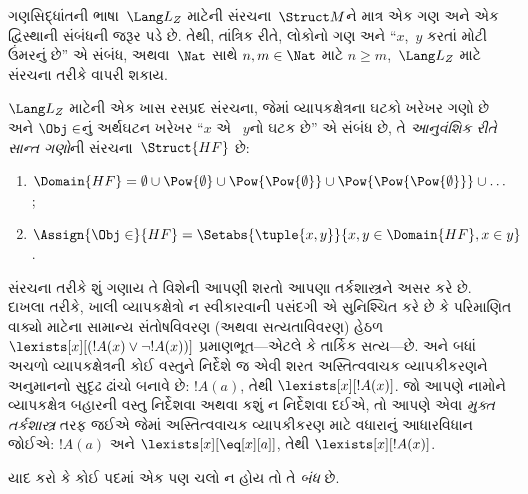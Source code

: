 \begin{ex}
ગણસિદ્ધાંતની ભાષા~$\Lang L_Z$ માટેની સંરચના~$\Struct M$ને માત્ર એક
ગણ અને એક દ્વિસ્થાની સંબંધની જરૂર પડે છે. તેથી, તાંત્રિક રીતે, લોકોનો
ગણ અને ``$x$,~$y$ કરતાં મોટી ઉંમરનું છે'' એ સંબંધ, અથવા~$\Nat$ સાથે
$n, m \in \Nat$ માટે $n \ge m$,~$\Lang L_Z$ માટે સંરચના
તરીકે વાપરી શકાય.

$\Lang L_Z$ માટેની એક ખાસ રસપ્રદ સંરચના, જેમાં વ્યાપકક્ષેત્રના
ઘટકો ખરેખર ગણો છે અને $\Obj \in$નું અર્થઘટન ખરેખર ``$x$ એ
~$y$નો ઘટક છે'' એ સંબંધ છે, તે \emph{આનુવંશિક રીતે સાન્ત
ગણો}ની સંરચના~$\Struct{{HF}}$ છે:
\begin{enumerate}
\item $\Domain{{{HF}}} = \emptyset \cup \Pow{\emptyset} \cup
  \Pow{\Pow{\emptyset}} \cup \Pow{\Pow{\Pow{\emptyset}}} \cup \dots$;
\item $\Assign{\Obj \in}{{{HF}}} = \Setabs{\tuple{x, y}}{x, y \in
  \Domain{{{HF}}}, x \in y}$.
\end{enumerate}
\end{ex}

\begin{digress}
સંરચના તરીકે શું ગણાય તે વિશેની આપણી શરતો આપણા તર્કશાસ્ત્રને
અસર કરે છે. દાખલા તરીકે, ખાલી વ્યાપકક્ષેત્રો ન સ્વીકારવાની પસંદગી એ સુનિશ્ચિત
કરે છે કે પરિમાણિત વાક્યો માટેના સામાન્ય સંતોષવિવરણ (અથવા
સત્યતાવિવરણ) હેઠળ $\lexists[x][(!A(x) \lor \lnot !A(x))]$
પ્રમાણભૂત---એટલે કે તાર્કિક સત્ય---છે. અને બધાં અચળો વ્યાપકક્ષેત્રની
કોઈ વસ્તુને નિર્દેશે જ એવી શરત અસ્તિત્વવાચક વ્યાપકીકરણને અનુમાનનો
સુદૃઢ ઢાંચો બનાવે છે: $!A(a)$, તેથી $\lexists[x][!A(x)]$. જો આપણે
નામોને વ્યાપકક્ષેત્ર બહારની વસ્તુ નિર્દેશવા અથવા કશું ન નિર્દેશવા દઈએ, તો
આપણે એવા \emph{મુક્ત તર્કશાસ્ત્ર} તરફ જઈએ જેમાં અસ્તિત્વવાચક
વ્યાપકીકરણ માટે વધારાનું આધારવિધાન જોઈએ: $!A(a)$ અને
$\lexists[x][\eq[x][a]]$, તેથી $\lexists[x][!A(x)]$.
\end{digress}
\endgroup


\begingroup
\makeatletter{}\makeatother


\label{guunit:OLP-0162}


\begin{explain}
યાદ કરો કે કોઈ પદમાં એક પણ ચલો ન હોય તો તે \emph{બંધ} છે.
\end{explain}

